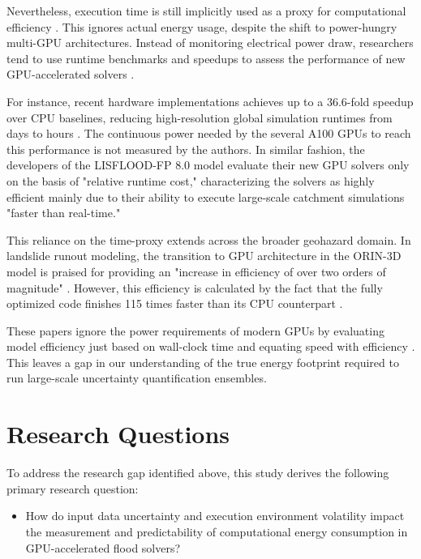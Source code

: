 Nevertheless, execution time is still implicitly used as a proxy for computational efficiency \cite{Kang2026, Shaw2021, Aaron2023}. This ignores actual energy usage, despite the shift to power-hungry multi-GPU architectures. Instead of monitoring electrical power draw, researchers tend to use runtime benchmarks and speedups to assess the performance of new GPU-accelerated solvers \cite{Kang2026, Shaw2021, Aaron2023}.

For instance, recent hardware implementations achieves up to a 36.6-fold speedup over CPU baselines, reducing high-resolution global simulation runtimes from days to hours \cite{Kang2026}. The continuous power needed by the several A100 GPUs to reach this performance is not measured by the authors. In similar fashion, the developers of the LISFLOOD-FP 8.0 model evaluate their new GPU solvers only on the basis of "relative runtime cost," characterizing the solvers as highly efficient mainly due to their ability to execute large-scale catchment simulations "faster than real-time." \cite{Shaw2021}

This reliance on the time-proxy extends across the broader geohazard domain. In landslide runout modeling, the transition to GPU architecture in the ORIN-3D model is praised for providing an "increase in efficiency of over two orders of magnitude" \cite{Aaron2023}. However, this efficiency is calculated by the fact that the fully optimized code finishes 115 times faster than its CPU counterpart \cite{Aaron2023}.

These papers ignore the power requirements of modern GPUs by evaluating model efficiency just based on wall-clock time and equating speed with efficiency \cite{Kang2026, Shaw2021, Aaron2023}. This leaves a gap in our understanding of the true energy footprint required to run large-scale uncertainty quantification ensembles.


\section{Research Questions}
\label{sec:research-questions}

To address the research gap identified above, this study derives the following primary research question:

\begin{itemize}
    \item How do input data uncertainty and execution environment volatility impact the measurement and predictability of computational energy consumption in GPU-accelerated flood solvers?
\end{itemize}

